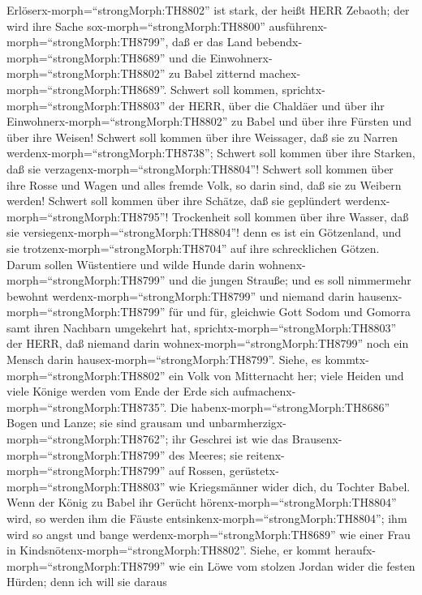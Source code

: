 Erlöserx-morph=``strongMorph:TH8802'' ist stark, der heißt HERR Zebaoth;
der wird ihre Sache sox-morph=``strongMorph:TH8800''
ausführenx-morph=``strongMorph:TH8799'', daß er das Land
bebendx-morph=``strongMorph:TH8689'' und die
Einwohnerx-morph=``strongMorph:TH8802'' zu Babel zitternd
machex-morph=``strongMorph:TH8689''.  Schwert soll kommen,
sprichtx-morph=``strongMorph:TH8803'' der HERR, über die Chaldäer und
über ihr Einwohnerx-morph=``strongMorph:TH8802'' zu Babel und über ihre
Fürsten und über ihre Weisen!  Schwert soll kommen über
ihre Weissager, daß sie zu Narren werdenx-morph=``strongMorph:TH8738'';
Schwert soll kommen über ihre Starken, daß sie
verzagenx-morph=``strongMorph:TH8804''!  Schwert soll
kommen über ihre Rosse und Wagen und alles fremde Volk, so darin sind,
daß sie zu Weibern werden! Schwert soll kommen über ihre Schätze, daß
sie geplündert werdenx-morph=``strongMorph:TH8795''! 
Trockenheit soll kommen über ihre Wasser, daß sie
versiegenx-morph=``strongMorph:TH8804''! denn es ist ein Götzenland, und
sie trotzenx-morph=``strongMorph:TH8704'' auf ihre schrecklichen Götzen.
 Darum sollen Wüstentiere und wilde Hunde darin
wohnenx-morph=``strongMorph:TH8799'' und die jungen Strauße; und es soll
nimmermehr bewohnt werdenx-morph=``strongMorph:TH8799'' und niemand
darin hausenx-morph=``strongMorph:TH8799'' für und für, 
gleichwie Gott Sodom und Gomorra samt ihren Nachbarn umgekehrt hat,
sprichtx-morph=``strongMorph:TH8803'' der HERR, daß niemand darin
wohnex-morph=``strongMorph:TH8799'' noch ein Mensch darin
hausex-morph=``strongMorph:TH8799''.  Siehe, es
kommtx-morph=``strongMorph:TH8802'' ein Volk von Mitternacht her; viele
Heiden und viele Könige werden vom Ende der Erde sich
aufmachenx-morph=``strongMorph:TH8735''.  Die
habenx-morph=``strongMorph:TH8686'' Bogen und Lanze; sie sind grausam
und unbarmherzigx-morph=``strongMorph:TH8762''; ihr Geschrei ist wie das
Brausenx-morph=``strongMorph:TH8799'' des Meeres; sie
reitenx-morph=``strongMorph:TH8799'' auf Rossen,
gerüstetx-morph=``strongMorph:TH8803'' wie Kriegsmänner wider dich, du
Tochter Babel.  Wenn der König zu Babel ihr Gerücht
hörenx-morph=``strongMorph:TH8804'' wird, so werden ihm die Fäuste
entsinkenx-morph=``strongMorph:TH8804''; ihm wird so angst und bange
werdenx-morph=``strongMorph:TH8689'' wie einer Frau in
Kindsnötenx-morph=``strongMorph:TH8802''.  Siehe, er kommt
heraufx-morph=``strongMorph:TH8799'' wie ein Löwe vom stolzen Jordan
wider die festen Hürden; denn ich will sie daraus
